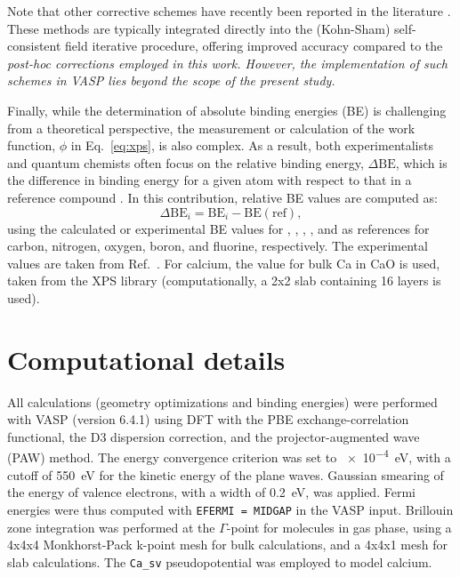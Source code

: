 \documentclass[journal=jpccck,manuscript=article]{achemso}
\begin{document}
Note that other corrective schemes have recently been reported in the literature \cite{freysoldtFirstprinciplesCalculationsCharged2018,freysoldtGeneralizedDipoleCorrection2020,chagasdasilvaSelfConsistentPotentialCorrection2021,rutterChargedSurfacesSlabs2021}. These methods are typically integrated directly into the (Kohn-Sham) self-consistent field iterative procedure, offering improved accuracy compared to the \textit{post-hoc corrections employed in this work. However, the implementation of such schemes in VASP lies beyond the scope of the present study.}

Finally, while the determination of absolute binding energies (BE) is challenging from a theoretical perspective, the measurement or calculation of the work function, $\phi$ in Eq.~\eqref{eq:xps}, is also complex. As a result, both experimentalists and quantum chemists often focus on the relative binding energy, $\Delta\text{BE}$, which is the difference in binding energy for a given atom with respect  to that in a reference compound \cite{vinesPredictionCoreLevel2018,stevieIntroductionXrayPhotoelectron2020,greczynskiXrayPhotoelectronSpectroscopy2020}. In this contribution, relative BE values are computed as:\begin{equation}
	\Delta\text{BE}_i = \text{BE}_i - \text{BE}(\text{ref}), \label{eq:dbe}
\end{equation} 
using the calculated or experimental BE values for , , , , and  as references for carbon, nitrogen, oxygen, boron, and fluorine, respectively. The experimental values are taken from Ref.~. For calcium, the value for bulk Ca in CaO is used, taken from the XPS library \cite{cristXPSLibraryWebsite2021a} (computationally, a  2x2 slab containing 16 layers is used).

	
\section{Computational details}\label{sec:comp}

All calculations (geometry optimizations and binding energies) were performed  with VASP (version 6.4.1) using DFT with the PBE exchange-correlation functional, the D3 dispersion correction, and the projector-augmented wave (PAW) method.\cite{blochlProjectorAugmentedwaveMethod1994} The energy convergence criterion was set to \SI{e-4}{\electronvolt}, with a cutoff of \SI{550}{\electronvolt} for the kinetic energy of the plane waves. Gaussian smearing of the energy of valence electrons, with a width of \SI{0.2}{\electronvolt}, was applied.  Fermi energies were thus computed with \texttt{EFERMI = MIDGAP} in the VASP input. Brillouin zone integration was performed at the $\Gamma$-point for molecules in gas phase, using a 4x4x4 Monkhorst-Pack k-point mesh\cite{monkhorstSpecialPointsBrillouinzone1976} for bulk calculations, and a 4x4x1 mesh for slab calculations. The \texttt{Ca\_sv} pseudopotential\cite{blochlProjectorAugmentedwaveMethod1994,kresseUltrasoftPseudopotentialsProjector1999} was employed to model calcium.
\end{document}

